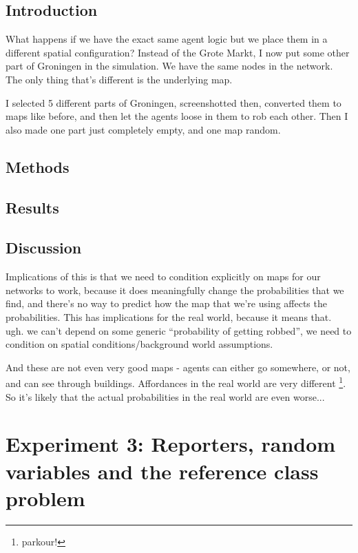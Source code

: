 \subsection{Introduction}
What happens if we have the exact same agent logic but we place them in a different spatial configuration? Instead of the Grote Markt, I now put some other part of Groningen in the simulation. We have the same nodes in the network. The only thing that's different is the underlying map.

I selected 5 different parts of Groningen, screenshotted then, converted them to maps like before, and then let the agents loose in them to rob each other.  Then I also made one part just completely empty, and one map random.

\subsection{Methods}

\subsection{Results}

\subsection{Discussion}
Implications of this is that we need to condition explicitly on maps for our networks to work, because it does meaningfully change the probabilities that we find, and there's no way to predict how the map that we're using affects the probabilities. This has implications for the real world, because it means that. ugh. we can't depend on some generic ``probability of getting robbed'', we need to condition on spatial conditions/background world assumptions.

And these are not even very good maps - agents can either go somewhere, or not, and can see through buildings. Affordances in the real world are very different \footnote{parkour!}. So it's likely that the actual probabilities in the real world are even worse...

\section{Experiment 3: Reporters, random variables and the reference class problem}

